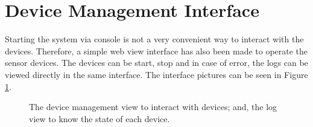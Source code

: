 \section{Device Management Interface}
Starting the system via console is not a very convenient way to interact with the devices. Therefore, a simple web view interface has also been made to operate the sensor devices. The devices can be start, stop and in case of error, the logs can be viewed directly in the same interface. The interface pictures can be seen in Figure \ref{fig:web_int_dev}.


\begin{figure}%
	\centering
	
	\hspace{15pt}%
	\caption[A set of four subfigures.]{
		 The device management view to interact with devices; and,
		 the log view to know the state of each device.}%
	\label{fig:web_int_dev}%
\end{figure}


